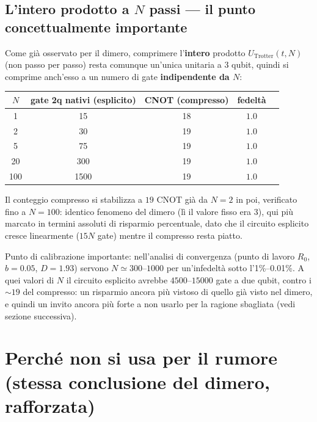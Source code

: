 \documentclass[11pt,a4paper]{article}
\begin{document}
\subsection*{L'intero prodotto a $N$ passi --- il punto concettualmente importante}

Come già osservato per il dimero, comprimere l'\textbf{intero} prodotto
$U_\text{Trotter}(t,N)$ (non passo per passo) resta comunque un'unica
unitaria a 3 qubit, quindi si comprime anch'esso a un numero di gate
\textbf{indipendente da $N$}:

\begin{center}
\renewcommand{\arraystretch}{1.3}
\begin{tabular}{ccccc}
\toprule
\rowcolor{inkblue!10}
$N$ & gate 2q nativi (esplicito) & CNOT (compresso) & fedeltà \\
\midrule
1   & 15   & 18 & $1.0$ \\
2   & 30   & 19 & $1.0$ \\
5   & 75   & 19 & $1.0$ \\
20  & 300  & 19 & $1.0$ \\
100 & 1500 & 19 & $1.0$ \\
\bottomrule
\end{tabular}
\end{center}

Il conteggio compresso si stabilizza a $19$ CNOT già da $N=2$ in poi,
verificato fino a $N=100$: identico fenomeno del dimero (lì il valore fisso
era 3), qui più marcato in termini assoluti di risparmio percentuale, dato
che il circuito esplicito cresce linearmente ($15N$ gate) mentre il
compresso resta piatto.

\begin{editnote}
Punto di calibrazione importante: nell'analisi di convergenza (punto di
lavoro $R_0$, $b{=}0.05$, $D{=}1.93$) servono $N\simeq300$--$1000$ per
un'infedeltà sotto l'1\%--0.01\%. A quei valori di $N$ il circuito
esplicito avrebbe $4500$--$15000$ gate a due qubit, contro i $\sim19$ del
compresso: un risparmio ancora più vistoso di quello già visto nel
dimero, e quindi un invito ancora più forte a non usarlo per la ragione
sbagliata (vedi sezione successiva).
\end{editnote}

\section{Perché non si usa per il rumore (stessa conclusione del dimero, rafforzata)}
\end{document}
